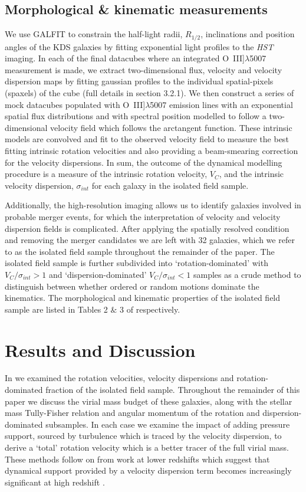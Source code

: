 \documentclass[fleqn,usenatbib]{mnras}
\begin{document}
\subsection{Morphological \& kinematic measurements}\label{subsec:measurements}
We use {\scriptsize GALFIT} \citep{Peng2010_galfit} to constrain the half-light radii, $R_{1/2}$, inclinations and position angles of the KDS galaxies by fitting exponential light profiles to the {\it HST} imaging.
In each of the final datacubes where an integrated O~{\sc III}]$\lambda$5007 measurement is made, we extract two-dimensional flux, velocity and velocity dispersion maps by fitting gaussian profiles to the individual spatial-pixels (spaxels) of the cube (full details in \cite{Turner2017} section 3.2.1).
We then construct a series of mock datacubes populated with O~{\sc III}]$\lambda$5007 emission lines with an exponential spatial flux distributions and with spectral position modelled to follow a two-dimensional velocity field which follows the arctangent function.
These intrinsic models are convolved and fit to the observed velocity field to measure the best fitting intrinsic rotation velocities and also providing a beam-smearing correction for the velocity dispersions.
In sum, the outcome of the dynamical modelling procedure is a measure of the intrinsic rotation velocity, $V_{C}$, and the intrinsic velocity dispersion, $\sigma_{int}$ for each galaxy in the isolated field sample. 

Additionally, the high-resolution imaging allows us to identify galaxies involved in probable merger events, for which the interpretation of velocity and velocity dispersion fields is complicated.
After applying the spatially resolved condition and removing the merger candidates we are left with 32 galaxies, which we refer to as the isolated field sample throughout the remainder of the paper.
The isolated field sample is further subdivided into `rotation-dominated' with $V_{C}/\sigma_{int} > 1$ and `dispersion-dominated' $V_{C}/\sigma_{int} < 1$ samples as a crude method to distinguish between whether ordered or random motions dominate the kinematics.
The morphological and kinematic properties of the isolated field sample are listed in Tables 2 $\&$ 3 of \cite{Turner2017} respectively.

\section{Results and Discussion}\label{sec:results}
In \cite{Turner2017} we examined the rotation velocities, velocity dispersions and rotation-dominated fraction of the isolated field sample.
Throughout the remainder of this paper we discuss the virial mass budget of these galaxies, along with the stellar mass Tully-Fisher relation and angular momentum of the rotation and dispersion-dominated subsamples.
In each case we examine the impact of adding pressure support, sourced by turbulence which is traced by the velocity dispersion, to derive a `total' rotation velocity which is a better tracer of the full virial mass.
These methods follow on from work at lower redshifts which suggest that dynamical support provided by a velocity dispersion term becomes increasingly significant at high redshift \citep[e.g.][]{Burkert2010,Newman2013,Wuyts2016b,Ubler2017}.  
\end{document}
